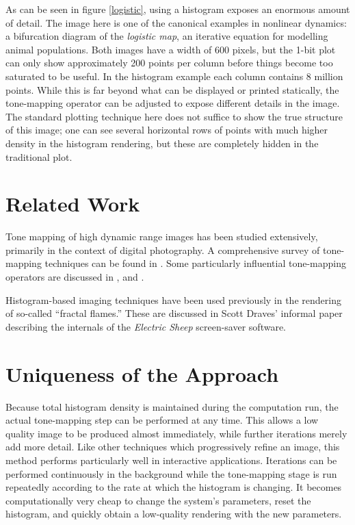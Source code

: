 \documentclass[letterpaper, 11pt]{article}
\begin{document}
As can be seen in figure \ref{logistic}, using a histogram exposes an enormous amount of
detail.  The image here is one of the canonical examples in nonlinear dynamics: a bifurcation
diagram of the \emph{logistic map}, an iterative equation for modelling animal populations.
Both images have a width of 600 pixels, but the 1-bit plot can only show approximately 200
points per column before things become too saturated to be useful.  In the histogram example
each column contains 8 million points.  While this is far beyond what can be displayed or
printed statically, the tone-mapping operator can be adjusted to expose different details
in the image.  The standard plotting technique here does not suffice to show the true structure
of this image;  one can see several horizontal rows of points with much higher density in
the histogram rendering, but these are completely hidden in the traditional plot.

\section{Related Work}
Tone mapping of high dynamic range images has been studied extensively, primarily in the
context of digital photography.  A comprehensive survey of tone-mapping techniques can be
found in \cite{kd}.  Some particularly influential tone-mapping operators are discussed
in \cite{jt}, \cite{jtjhbg} and \cite{gw}.

Histogram-based imaging techniques have been used previously in the rendering of so-called
``fractal flames.''  These are discussed in Scott Draves' informal paper describing the
internals of the \emph{Electric Sheep} screen-saver software\cite{sd}.

\section{Uniqueness of the Approach}
Because total histogram density is maintained during the computation run, the actual
tone-mapping step can be performed at any time.  This allows a low quality image to
be produced almost immediately, while further iterations merely add more detail.  Like
other techniques which progressively refine an image, this method performs particularly
well in interactive applications.  Iterations can be performed continuously in the
background while the tone-mapping stage is run repeatedly according to the rate at which
the histogram is changing.  It becomes computationally very cheap to change the system's
parameters, reset the histogram, and quickly obtain a low-quality rendering with the
new parameters.
\end{document}
